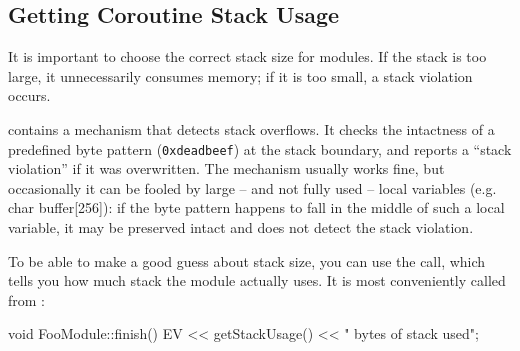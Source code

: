 %
%
%
%





\subsection{Getting Coroutine Stack Usage}
\label{sec:sim-lib:getting-coroutine-stack-usage}

It is important to choose the correct stack size for
modules.  If the stack is
too large, it unnecessarily consumes memory; if it is too small, a stack
violation occurs.

{\opp} contains a mechanism that detects stack
overflows. It checks the intactness of a
predefined byte pattern (\texttt{0xdeadbeef}) at the stack boundary,
and reports a ``stack violation'' if it was
overwritten. The mechanism usually works fine, but occasionally it can
be fooled by large -- and not fully used -- local variables (e.g. char
buffer[256]): if the byte pattern happens to fall in the middle of
such a local variable, it may be preserved intact and {\opp} does not
detect the stack violation.

To be able to make a good guess about stack size, you can use
the  call, which tells you how much stack the module
actually uses. It is most conveniently called from :

\begin{cpp}
void FooModule::finish()
{
    EV << getStackUsage() << " bytes of stack used\n";
}
\end{cpp}


